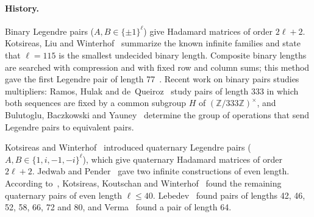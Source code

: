 \documentclass[11pt]{article}
\theoremstyle{remark}
\newcommand{\Z}{\mathbb{Z}}
\begin{document}
\paragraph{History.} Binary Legendre pairs ($A, B \in \{\pm 1\}^\ell$) give Hadamard matrices of order $2\ell + 2$. Kotsireas, Liu and Winterhof~\cite[Section~1]{KLW} summarize the known infinite families and state that $\ell = 115$ is the smallest undecided binary length. Composite binary lengths are searched with compression and with fixed row and column sums; this method gave the first Legendre pair of length 77~\cite{TKBG}. Recent work on binary pairs studies multipliers: Ramos, Hulak and de~Queiroz~\cite{RHQ} study pairs of length 333 in which both sequences are fixed by a common subgroup $H$ of $(\Z/333\Z)^\times$, and Bulutoglu, Baczkowski and Yauney~\cite{BBY} determine the group of operations that send Legendre pairs to equivalent pairs.

Kotsireas and Winterhof~\cite{KW} introduced quaternary Legendre pairs ($A, B \in \{1, i, -1, -i\}^\ell$), which give quaternary Hadamard matrices of order $2\ell + 2$. Jedwab and Pender~\cite{JP} gave two infinite constructions of even length. According to~\cite[Section~1]{KLW}, Kotsireas, Koutschan and Winterhof~\cite{KW,KKW} found the remaining quaternary pairs of even length $\ell \le 40$. Lebedev~\cite{Leb} found pairs of lengths 42, 46, 52, 58, 66, 72 and 80, and Verma~\cite{Ver} found a pair of length 64.
\end{document}
